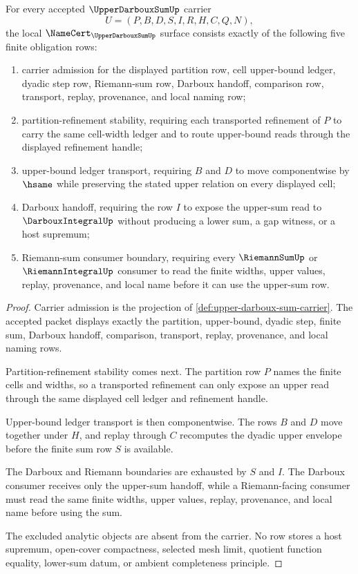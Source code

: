 \begin{theorem}\label{thm:upper-darboux-sum-namecert-obligations}
For every accepted $\UpperDarbouxSumUp$ carrier
$$
U=(P,B,D,S,I,R,H,C,Q,N),
$$
the local $\NameCert_{\UpperDarbouxSumUp}$ surface consists exactly of the following five finite obligation rows:
\begin{enumerate}
\item carrier admission for the displayed partition row, cell upper-bound ledger, dyadic step row, Riemann-sum row, Darboux handoff, comparison row, transport, replay, provenance, and local naming row;
\item partition-refinement stability, requiring each transported refinement of $P$ to carry the same cell-width ledger and to route upper-bound reads through the displayed refinement handle;
\item upper-bound ledger transport, requiring $B$ and $D$ to move componentwise by $\hsame$ while preserving the stated upper relation on every displayed cell;
\item Darboux handoff, requiring the row $I$ to expose the upper-sum read to $\DarbouxIntegralUp$ without producing a lower sum, a gap witness, or a host supremum;
\item Riemann-sum consumer boundary, requiring every $\RiemannSumUp$ or $\RiemannIntegralUp$ consumer to read the finite widths, upper values, replay, provenance, and local name before it can use the upper-sum row.
\end{enumerate}
\end{theorem}
\begin{proof}
Carrier admission is the projection of \autoref{def:upper-darboux-sum-carrier}. The accepted packet displays exactly the partition, upper-bound, dyadic step, finite sum, Darboux handoff, comparison, transport, replay, provenance, and local naming rows.

Partition-refinement stability comes next. The partition row $P$ names the finite cells and widths, so a transported refinement can only expose an upper read through the same displayed cell ledger and refinement handle.

Upper-bound ledger transport is then componentwise. The rows $B$ and $D$ move together under $H$, and replay through $C$ recomputes the dyadic upper envelope before the finite sum row $S$ is available.

The Darboux and Riemann boundaries are exhausted by $S$ and $I$. The Darboux consumer receives only the upper-sum handoff, while a Riemann-facing consumer must read the same finite widths, upper values, replay, provenance, and local name before using the sum.

The excluded analytic objects are absent from the carrier. No row stores a host supremum, open-cover compactness, selected mesh limit, quotient function equality, lower-sum datum, or ambient completeness principle.
\end{proof}

